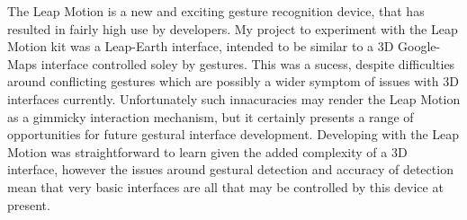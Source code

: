 \documentclass{sigplanconf}
\begin{document}
The Leap Motion is a new and exciting gesture recognition device, that has resulted in fairly high use by developers. My project to experiment with the Leap Motion kit was a Leap-Earth interface, intended to be similar to a 3D Google-Maps interface controlled soley by gestures. This was a sucess, despite difficulties around conflicting gestures which are possibly a wider symptom of issues with 3D interfaces currently. Unfortunately such innacuracies may render the Leap Motion as a gimmicky interaction mechanism, but it certainly presents a range of opportunities for future gestural interface development. Developing with the Leap Motion was straightforward to learn given the added complexity of a 3D interface, however the issues around gestural detection and accuracy of detection mean that very basic interfaces are all that may be controlled by this device at present. 









\end{document}
